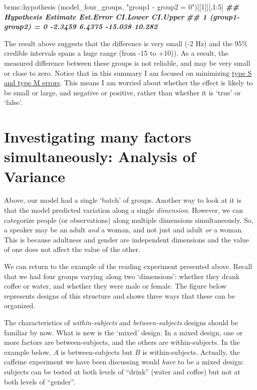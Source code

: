 \documentclass[
]{book}
\newenvironment{Shaded}{\begin{snugshade}}{\end{snugshade}}
\newcommand{\DecValTok}[1]{\textcolor[rgb]{0.00,0.00,0.81}{#1}}
\newcommand{\DocumentationTok}[1]{\textcolor[rgb]{0.56,0.35,0.01}{\textbf{\textit{#1}}}}
\newcommand{\FunctionTok}[1]{\textcolor[rgb]{0.00,0.00,0.00}{#1}}
\newcommand{\NormalTok}[1]{#1}
\newcommand{\SpecialCharTok}[1]{\textcolor[rgb]{0.00,0.00,0.00}{#1}}
\newcommand{\StringTok}[1]{\textcolor[rgb]{0.31,0.60,0.02}{#1}}
\begin{document}
\begin{Shaded}
\begin{Highlighting}[]
\NormalTok{brms}\SpecialCharTok{::}\FunctionTok{hypothesis}\NormalTok{ (model\_four\_groups, }\StringTok{"group1 {-} group2 = 0"}\NormalTok{)[[}\DecValTok{1}\NormalTok{]][,}\DecValTok{1}\SpecialCharTok{:}\DecValTok{5}\NormalTok{]}
\DocumentationTok{\#\#            Hypothesis Estimate Est.Error CI.Lower CI.Upper}
\DocumentationTok{\#\# 1 (group1{-}group2) = 0  {-}2.3459    6.4375  {-}15.038   10.282}
\end{Highlighting}
\end{Shaded}

The result above suggests that the difference is very small (-2 Hz) and the 95\% credible intervals spans a huge range (from -15 to +10)). As a result, the measured difference between these groups is not reliable, and may be very small or close to zero. Notice that in this summary I am focused on minimizing \href{https://statmodeling.stat.columbia.edu/2004/12/29/type_1_type_2_t/}{type S and type M errors}. This means I am worried about whether the effect is likely to be small or large, and negative or positive, rather than whether it is `true' or `false'.

\hypertarget{investigating-many-factors-simultaneously-analysis-of-variance}{%
\section{Investigating many factors simultaneously: Analysis of Variance}\label{investigating-many-factors-simultaneously-analysis-of-variance}}

Above, our model had a single `batch' of groups. Another way to look at it is that the model predicted variation along a single \emph{dimension}. However, we can categorize people (or observations) along multiple dimensions simultaneously. So, a speaker may be an adult \emph{and} a woman, and not just and adult \emph{or} a woman. This is because adultness and gender are independent dimensions and the value of one does not affect the value of the other.

We can return to the example of the reading experiment presented above. Recall that we had four groups varying along two `dimensions': whether they drank coffee or water, and whether they were male or female. The figure below represents designs of this structure and shows three ways that these can be organized.

The characteristics of \emph{within-subjects} and \emph{between-subjects} designs should be familiar by now. What is new is the `mixed' design. In a mixed design, one or more factors are between-subjects, and the others are within-subjects. In the example below, \(A\) is between-subjects but \(B\) is within-subjects. Actually, the caffeine experiment we have been discussing would \emph{have} to be a mixed design: subjects can be tested at both levels of ``drink'' (water and coffee) but not at both levels of ``gender''.
\end{document}
